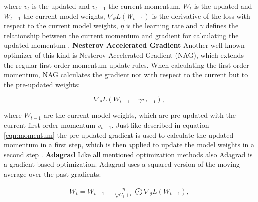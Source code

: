 where $v_{t}$ is the updated and $v_{t-1}$ the current momentum, $W_{t}$ is the updated and $W_{t-1}$ the current model weights, $\nabla_{\theta}L(W_{t-1})$ is the derivative of the loss with respect to the current model weights, $\eta$ is the learning rate and $\gamma$ defines the relationship between the current momentum and gradient for calculating the updated momentum \cite{Ruder2016}.
\newline
\newline
\textbf{Nesterov Accelerated Gradient}
\newline
Another well known optimizer of this kind is Nesterov Accelerated Gradient (NAG), which extends the regular first order momentum update rules. When calculating the first order momentum, NAG calculates the gradient not with respect to the current but to the pre-updated weights: 

\begin{equation}
    \nabla_{\theta}L( W_{t-1} - \gamma v_{t-1}),
\end{equation}

where $W_{t-1}$ are the current model weights, which are pre-updated with the current first order momentum $v_{t-1}$. Just like described in equation \ref{eqn:momentum} the pre-updated gradient is used to calculate the updated momentum in a first step, which is then applied to update the model weights in a second step \cite{Ruder2016}.
\newline
\newline
\textbf{Adagrad}
\newline
Like all mentioned optimization methods also Adagrad is a gradient based optimization. Adagrad uses a squared version of the moving average over the past gradients:

\begin{equation}
  \begin{aligned}
  W_{t} = W_{t-1} - \frac{\eta}{\sqrt[2]{G_{t}+ \epsilon}} \bigodot \nabla_{\theta}L(W_{t-1}),
  \end{aligned}
  \label{eq:Adagrad}
\end{equation}

